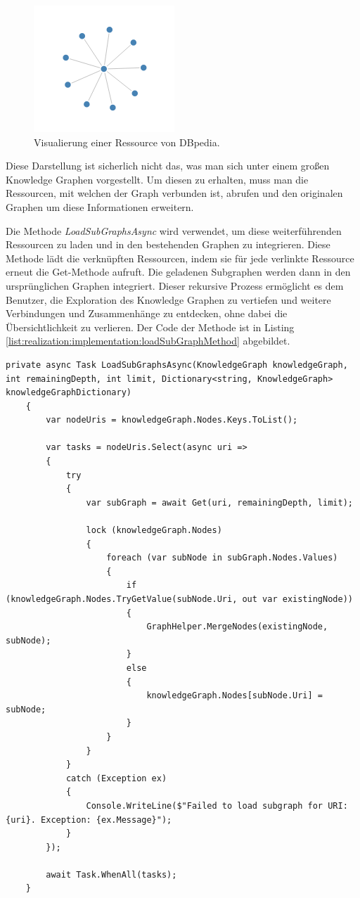 \begin{figure}[h]
    \centering
    \includegraphics[height=.3\textwidth]{images/03/SimpleGraph.png}
    \caption{Visualierung einer Ressource von DBpedia.}
    \label{fig:realization:implementation:simpleGraph}
\end{figure}

Diese Darstellung ist sicherlich nicht das, was man sich unter einem großen Knowledge Graphen vorgestellt. Um diesen zu erhalten, muss man die Ressourcen, mit welchen der Graph verbunden ist, abrufen und den originalen Graphen um diese Informationen erweitern.

Die Methode \textit{LoadSubGraphsAsync} wird verwendet, um diese weiterführenden Ressourcen zu laden und in den bestehenden Graphen zu integrieren. Diese Methode lädt die verknüpften Ressourcen, indem sie für jede verlinkte Ressource erneut die Get-Methode aufruft. Die geladenen Subgraphen werden dann in den ursprünglichen Graphen integriert. Dieser rekursive Prozess ermöglicht es dem Benutzer, die Exploration des Knowledge Graphen zu vertiefen und weitere Verbindungen und Zusammenhänge zu entdecken, ohne dabei die Übersichtlichkeit zu verlieren. Der Code der Methode ist in Listing \ref{list:realization:implementation:loadSubGraphMethod} abgebildet.

\begin{lstlisting}[caption={\textit{LoadSubGraphsAsync}-Methode zum rekursiven Laden der Graph-Ressourcen}, label={list:realization:implementation:loadSubGraphMethod}]
    private async Task LoadSubGraphsAsync(KnowledgeGraph knowledgeGraph, int remainingDepth, int limit, Dictionary<string, KnowledgeGraph> knowledgeGraphDictionary)
    {
        var nodeUris = knowledgeGraph.Nodes.Keys.ToList();

        var tasks = nodeUris.Select(async uri =>
        {
            try
            {
                var subGraph = await Get(uri, remainingDepth, limit);

                lock (knowledgeGraph.Nodes)
                {
                    foreach (var subNode in subGraph.Nodes.Values)
                    {
                        if (knowledgeGraph.Nodes.TryGetValue(subNode.Uri, out var existingNode))
                        {
                            GraphHelper.MergeNodes(existingNode, subNode);
                        }
                        else
                        {
                            knowledgeGraph.Nodes[subNode.Uri] = subNode;
                        }
                    }
                }
            }
            catch (Exception ex)
            {
                Console.WriteLine($"Failed to load subgraph for URI: {uri}. Exception: {ex.Message}");
            }
        });

        await Task.WhenAll(tasks);
    }
\end{lstlisting}

